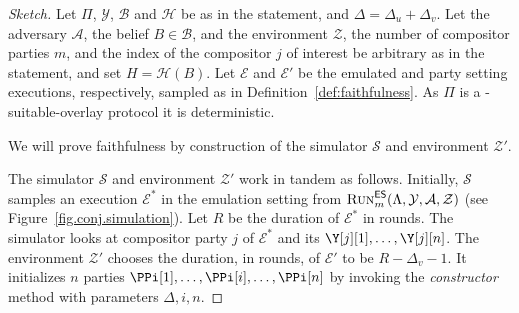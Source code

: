 \restateConjSim*
\begin{proof}[Sketch]
  Let $\Pi$, $\mathcal{Y}$, $\mathcal{B}$ and $\mathcal{H}$
  be as in the statement, and $\Delta = \Delta_u + \Delta_v$.
  Let the adversary $\mathcal{A}$, the belief $B \in \mathcal{B}$,
  and the environment $\mathcal{Z}$, the number of compositor parties $m$,
  and the index of the compositor $j$ of interest be arbitrary
  as in the statement, and set $H = \mathcal{H}(B)$.
  Let $\mathcal{E}$ and $\mathcal{E}'$ be the emulated and party setting
  executions, respectively, sampled as in Definition~\ref{def:faithfulness}.
  As $\Pi$ is a \rollerblade-suitable-overlay protocol it is deterministic.

  We will prove faithfulness by
  construction of the simulator $\mathcal{S}$ and environment $\mathcal{Z}'$.

  The simulator $\mathcal{S}$ and environment $\mathcal{Z}'$ work in tandem
  as follows.
  Initially, $\mathcal{S}$ samples an execution
  $\mathcal{E}^*$ in the emulation setting from
  $\textsc{Run}^{\textsf{ES}}_m(\Lambda,\allowbreak\mathcal{Y},\allowbreak\mathcal{A},\allowbreak\mathcal{Z})$
  (see Figure~\ref{fig.conj.simulation}).
  Let $R$ be the duration of $\mathcal{E}^*$ in rounds.
  The simulator looks at compositor party $j$ of $\mathcal{E}^*$
  and its $\Y[j][1], \ldots, \Y[j][n]$.
  The environment $\mathcal{Z}'$ chooses the duration, in rounds, of
  $\mathcal{E}'$ to be $R - \Delta_v - 1$. It initializes $n$
  parties $\PPi[1], \ldots, \PPi[i], \ldots, \PPi[n]$ by invoking
  the \emph{constructor} method with parameters $\Delta, i, n$.


\end{proof}
